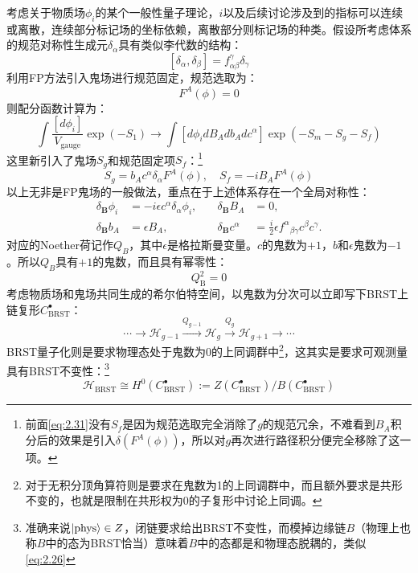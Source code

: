 考虑关于物质场$\phi_i$的某个一般性量子理论，$i$以及后续讨论涉及到的指标可以连续或离散，连续部分标记场的坐标依赖，离散部分则标记场的种类。假设所考虑体系的规范对称性生成元$\delta_\alpha$具有类似李代数的结构：
\begin{equation}
	\label{eq:2.41}
	[\delta_\alpha,\delta_\beta]=f_{\alpha\beta}^\gamma\delta_\gamma
\end{equation}
利用FP方法引入鬼场进行规范固定，规范选取为：
\begin{equation}
	F^A(\phi)=0
\end{equation}
则配分函数计算为：
\begin{equation}
	\int\frac{[d\phi_i]}{V_{\mathrm{gauge}}}\exp(-S_1)\to\int[d\phi_idB_Adb_Adc^\alpha]\exp(-S_m-S_g-S_f)
\end{equation}
这里新引入了鬼场$S_g$和规范固定项$S_f$：\footnote{前面\ref{eq:2.31}没有$S_f$是因为规范选取完全消除了$g$的规范冗余，不难看到$B_A$积分后的效果是引入$\delta(F^A(\phi))$，所以对$g$再次进行路径积分便完全移除了这一项。}
\begin{equation}
	S_g=b_Ac^\alpha\delta_\alpha F^A(\phi),\quad S_f=-iB_AF^A(\phi)
\end{equation}
以上无非是FP鬼场的一般做法，重点在于上述体系存在一个全局对称性：
\begin{equation}
	\begin{aligned}
		\delta_{\mathbf{B}}\phi_i 
		&= -i\epsilon c^\alpha\delta_\alpha\phi_i,  
		& \quad \delta_{\mathbf{B}}B_A 
		&= 0, \\
		\delta_{\mathbf{B}}b_{A} 
		&= \epsilon B_A,  
		& \quad \delta_{\mathbf{B}}c^{\alpha} 
		&= \frac{i}{2}\epsilon f^\alpha{}_{\beta\gamma} c^\beta c^\gamma.
	\end{aligned}
\end{equation}
对应的Noether荷记作$Q_B$，其中$\epsilon$是格拉斯曼变量。$c$的鬼数为$+1$，$b$和$\epsilon$鬼数为$-1$。所以$Q_B$具有$+1$的鬼数，而且具有幂零性：
\begin{equation}
	Q_{\mathrm{B}}^2=0
\end{equation}
考虑物质场和鬼场共同生成的希尔伯特空间，以鬼数为分次可以立即写下BRST上链复形$C^{\bullet}_{\mathrm{BRST}}$：
\begin{equation}
	\cdots\longrightarrow\mathscr{H}_{g-1}\xrightarrow{Q_{g-1}}\mathscr{H}_g\xrightarrow{Q_g}\mathscr{H}_{g+1}\longrightarrow\cdots
\end{equation}
BRST量子化则是要求物理态处于鬼数为0的上同调群中\footnote{对于无积分顶角算符则是要求在鬼数为1的上同调群中，而且额外要求是共形不变的，也就是限制在共形权为0的子复形中讨论上同调。}，这其实是要求可观测量具有BRST不变性：\footnote{准确来说$\ket{\text{phys}}\in Z$，闭链要求给出BRST不变性，而模掉边缘链$B$（物理上也称$B$中的态为BRST恰当）意味着$B$中的态都是和物理态脱耦的，类似\ref{eq:2.26}}
\begin{equation}
	\label{eq:2.48}
	\mathscr{H}_{\mathrm{BRST}}\cong H^0(C^\bullet_{\mathrm{BRST}}):=Z(C^\bullet_{\mathrm{BRST}})/B(C^\bullet_{\mathrm{BRST}})
\end{equation}

